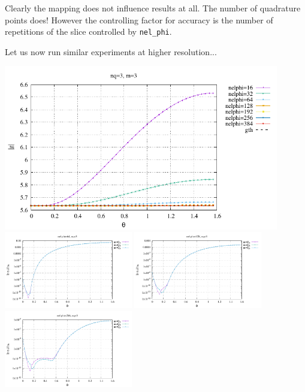 Clearly the mapping does not influence results at all. The number of quadrature points does!
However the controlling factor for accuracy is the number of repetitions of the slice controlled
by {\tt nel\_phi}.

Let us now run similar experiments at higher resolution...

\begin{center}
\includegraphics[width=12cm]{python_codes/fieldstone_152/RESULTS/exp1/gravity/nelr64/gravity.pdf}\\
\includegraphics[width=5.6cm]{python_codes/fieldstone_152/RESULTS/exp1/gravity/nelr64/gravity_64m.pdf}
\includegraphics[width=5.6cm]{python_codes/fieldstone_152/RESULTS/exp1/gravity/nelr64/gravity_128m.pdf}
\includegraphics[width=5.6cm]{python_codes/fieldstone_152/RESULTS/exp1/gravity/nelr64/gravity_256m.pdf}\\

\end{center}
